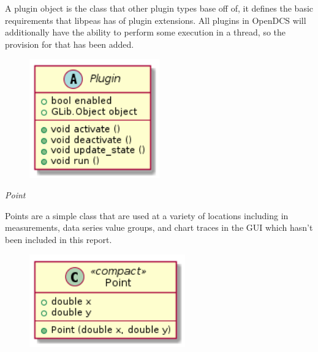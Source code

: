       \vspace*{-0.75cm}
      \begin{minipage}[t]{0.5\textwidth}
        \vspace*{0.5cm}
        A plugin object is the class that other plugin types base off of, it
        defines the basic requirements that libpeas has of plugin extensions.
        All plugins in OpenDCS will additionally have the ability to perform
        some execution in a thread, so the provision for that has been added.
      \end{minipage} \hfill
      \begin{minipage}[t]{0.45\textwidth}
        \begin{figure}[H]
          \includegraphics[width=0.5\textwidth]{figures/design/class/core/plugin}
          \label{fig:dsg-classes-plugin}
        \end{figure}
      \end{minipage}

      \emph{Point}

      \vspace*{-0.75cm}
      \begin{minipage}[t]{0.5\textwidth}
        \vspace*{0.5cm}
        Points are a simple class that are used at a variety of locations
        including in measurements, data series value groups, and chart traces
        in the GUI which hasn't been included in this report.
      \end{minipage} \hfill
      \begin{minipage}[t]{0.45\textwidth}
        \begin{figure}[H]
          \includegraphics[width=0.6\textwidth]{figures/design/class/core/point}
          \label{fig:dsg-classes-point}
        \end{figure}
      \end{minipage}

